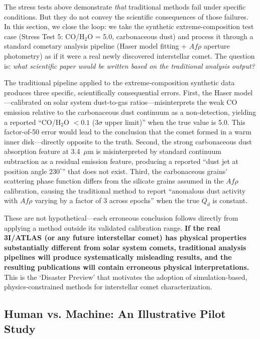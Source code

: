 \documentclass[usenatbib]{mnras}
\begin{document}
The stress tests above demonstrate \textit{that} traditional methods fail under specific conditions. But they do not convey the scientific consequences of those failures. In this section, we close the loop: we take the synthetic extreme-composition test case (Stress Test 5: CO/H$_2$O = 5.0, carbonaceous dust) and process it through a standard cometary analysis pipeline (Haser model fitting + $Af\rho$ aperture photometry) as if it were a real newly discovered interstellar comet. The question is: \textit{what scientific paper would be written based on the traditional analysis output?}

The traditional pipeline applied to the extreme-composition synthetic data produces three specific, scientifically consequential errors. First, the Haser model---calibrated on solar system dust-to-gas ratios---misinterprets the weak CO emission relative to the carbonaceous dust continuum as a non-detection, yielding a reported ``CO/H$_2$O $< 0.1$ (3$\sigma$ upper limit)'' when the true value is 5.0. This factor-of-50 error would lead to the conclusion that the comet formed in a warm inner disk---directly opposite to the truth. Second, the strong carbonaceous dust absorption feature at 3.4~$\mu$m is misinterpreted by standard continuum subtraction as a residual emission feature, producing a reported ``dust jet at position angle $230^\circ$'' that does not exist. Third, the carbonaceous grains' scattering phase function differs from the silicate grains assumed in the $Af\rho$ calibration, causing the traditional method to report ``anomalous dust activity with $Af\rho$ varying by a factor of 3 across epochs'' when the true $Q_d$ is constant.

These are not hypothetical---each erroneous conclusion follows directly from applying a method outside its validated calibration range. \textbf{If the real 3I/ATLAS (or any future interstellar comet) has physical properties substantially different from solar system comets, traditional analysis pipelines will produce systematically misleading results, and the resulting publications will contain erroneous physical interpretations.} This is the `Disaster Preview' that motivates the adoption of simulation-based, physics-constrained methods for interstellar comet characterization.

\subsection{Human vs. Machine: An Illustrative Pilot Study}\label{sec:human_blind}
\end{document}
